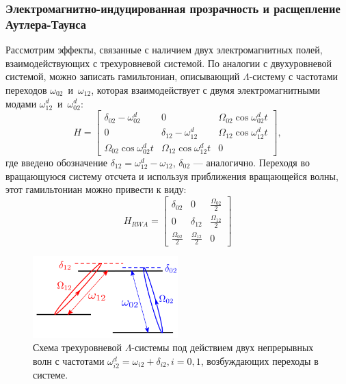 \subsubsection{Электромагнитно-индуцированная прозрачность и расщепление Аутлера-Таунса}\label{AT}
Рассмотрим эффекты, связанные с наличием двух электромагнитных полей, взаимодействующих с трехуровневой системой. По аналогии с двухуровневой системой, можно записать гамильтониан, описывающий $\Lambda$-систему с частотами переходов $\omega_{02}$~и~$\omega_{12}$, которая взаимодействует с двумя электромагнитными модами $\omega^d_{12}$~и~$\omega^d_{02}$:
\begin{equation}
H = \left[\begin{matrix}\delta_{02} - \omega^{d}_{02} & 0 & \Omega_{02} \cos{\omega^{d}_{02} t }\\0 & \delta_{12} - \omega^{d}_{12} & \Omega_{12} \cos{\omega^{d}_{12} t }\\\Omega_{02} \cos{\omega^{d}_{02} t } & \Omega_{12} \cos{\omega^{d}_{12} t } & 0\end{matrix}\right],
\end{equation}
где введено обозначение $\delta_{12} = \omega^d_{12}-\omega_{12}$, $\delta_{02}$ --- аналогично. Переходя во вращающуюся систему отсчета и используя приближения вращающейся волны, этот гамильтониан можно привести к виду:
\begin{equation}
H_{RW\!A}=\left[\begin{matrix}\delta_{02} & 0 & \frac{\Omega_{02}}{2}\\0 & \delta_{12} & \frac{\Omega_{12}}{2}\\\frac{\Omega_{02}}{2} & \frac{\Omega_{12}}{2} & 0\end{matrix}\right]
\label{eq: 3LS_Hrwa}
\end{equation}
\begin{figure}[h]
	\centering
	\includegraphics[width=0.5\textwidth]{images/ATS.png}
	\caption[Схема возбуждения $\Lambda$-системы электромагнитным полем]{Схема трехуровневой $\Lambda$-системы под действием двух непрерывных волн с частотами $\omega^d_{i2} = \omega_{i2}+\delta_{i2}, i={0,1}$, возбуждающих переходы в системе. }
	\label{img: Lambda}
\end{figure}
